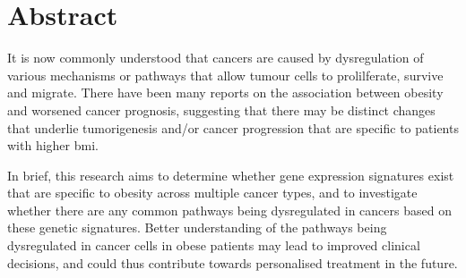 \vspace*{\fill}

\section*{\centering Abstract}

It is now commonly understood that cancers are caused by dysregulation of various mechanisms or pathways that allow tumour cells to prolilferate, survive and migrate.
There have been many reports on the association between obesity and worsened cancer prognosis, suggesting that there may be distinct changes that underlie tumorigenesis and/or cancer progression that are specific to patients with higher \gls{bmi}.

In brief, this research aims to determine whether gene expression signatures exist that are specific to obesity across multiple cancer types, and to investigate whether there are any common pathways being dysregulated in cancers based on these genetic signatures.
Better understanding of the pathways being dysregulated in cancer cells in obese patients may lead to improved clinical decisions, and could thus contribute towards personalised treatment in the future.

\vfill
